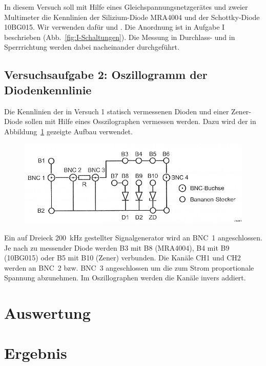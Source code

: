 In diesem Versuch soll mit Hilfe eines Gleichspannungsnetzgerätes und zweier
Multimeter die Kennlinien der Silizium-Diode MRA4004 und der Schottky-Diode
10BG015. Wir verwenden dafür \fehlt und \fehlt. Die Anordnung ist in Aufgabe I
beschrieben (Abb.~\ref{fig:I-Schaltungen}). Die Messung in Durchlass- und in
Sperrrichtung werden dabei nacheinander durchgeführt.

\subsection{Versuchsaufgabe 2: Oszillogramm der Diodenkennlinie}

Die Kennlinien der in Versuch 1 statisch vermessenen Dioden und einer Zener-Diode sollen mit Hilfe eines Osszilographen vermessen werden. Dazu wird der in Abbildung~\ref{fig:2-6} gezeigte Aufbau verwendet.

\begin{figure}
	\centering
	\includegraphics[width=.8\linewidth]{Bilder_aus_Anleitung/2-6.png}
	\caption{%
		\fehlt
	}
	\label{fig:2-6}
\end{figure}

Ein auf Dreieck \SI{200}{\kilo\hertz} gestellter Signalgenerator wird an BNC~1 angeschlossen. Je nach zu messender Diode werden B3 mit B8 (MRA4004), B4 mit B9 (10BG015) oder B5 mit B10 (Zener) verbunden. Die Kanäle CH1 und CH2 werden an BNC~2 bzw. BNC~3 angeschlossen um die zum Strom proportionale Spannung abzunehmen. Im Oszillographen werden die Kanäle invers addiert. 


\section{Auswertung}


\section{Ergebnis}

\IfFileExists{\bibliographyfile}{
	
}{}




